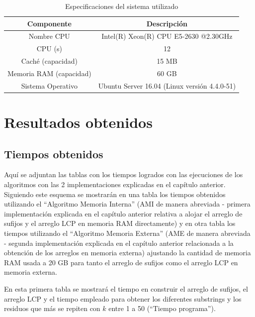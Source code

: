 \begin{table}[h]
\centering
\begin{tabular}{|c|c|}
\hline
\textbf{Componente}     & \textbf{Descripción}                         \\ \hline
Nombre CPU              & Intel(R) Xeon(R) CPU E5-2630 @2.30GHz        \\
CPU (s)                 & 12                                           \\
Caché (capacidad)       & 15 MB                                        \\
Memoria RAM (capacidad) & 60 GB                                        \\
Sistema Operativo       & Ubuntu Server 16.04 (Linux versión 4.4.0-51) \\ \hline
\end{tabular}
\caption{Especificaciones del sistema utilizado}
\label{tb:labelr2}
\end{table}

\section{Resultados obtenidos}

\subsection{Tiempos obtenidos}

Aquí se adjuntan las tablas con los tiempos logrados con las ejecuciones de los algoritmos con las 2 implementaciones explicadas en el capítulo anterior. Siguiendo este esquema se mostrarán en una tabla los tiempos obtenidos utilizando el ``Algoritmo Memoria Interna'' (AMI de manera abreviada - primera implementación explicada en el capítulo anterior relativa a alojar el arreglo de sufijos y el arreglo LCP en memoria RAM directamente) y en otra tabla los tiempos utilizando el ``Algoritmo Memoria Externa'' (AME de manera abreviada - segunda implementación explicada en el capítulo anterior relacionada a la obtención de los arreglos en memoria externa) ajustando la cantidad de memoria RAM usada a 20 GB para tanto el arreglo de sufijos como el arreglo LCP en memoria externa. 

En esta primera tabla se mostrará el tiempo en construir el arreglo de sufijos, el arreglo LCP y el tiempo empleado para obtener los diferentes substrings y los residuos que más se repiten con $k$ entre 1 a 50 (``Tiempo programa'').

